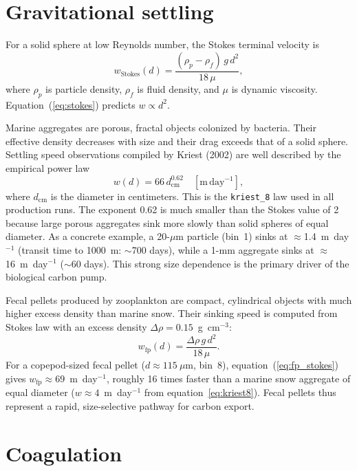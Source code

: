 \documentclass[12pt,a4paper]{report}
\numberwithin{equation}{chapter}
\begin{document}
\section{Gravitational settling}

For a solid sphere at low Reynolds number, the Stokes terminal velocity is
\begin{equation}
    w_\mathrm{Stokes}(d)
    = \frac{(\rho_p - \rho_f)\,g\,d^2}{18\,\mu},
    \label{eq:stokes}
\end{equation}
where $\rho_p$ is particle density, $\rho_f$ is fluid density, and $\mu$ is
dynamic viscosity. Equation~(\ref{eq:stokes}) predicts $w \propto d^2$.

Marine aggregates are porous, fractal objects colonized by bacteria. Their
effective density decreases with size and their drag exceeds that of a solid
sphere. Settling speed observations compiled by Kriest (2002) are well
described by the empirical power law
\begin{equation}
    w(d) = 66\,d_\mathrm{cm}^{0.62} \quad [\mathrm{m\,day^{-1}}],
    \label{eq:kriest8}
\end{equation}
where $d_\mathrm{cm}$ is the diameter in centimeters.
This is the \texttt{kriest\_8} law used in all production runs.
The exponent 0.62 is much smaller than the Stokes value of 2 because large
porous aggregates sink more slowly than solid spheres of equal diameter.
As a concrete example, a 20-$\mu$m particle (bin~1) sinks at
$\approx$1.4~m~day$^{-1}$ (transit time to 1000~m: $\sim$700 days), while
a 1-mm aggregate sinks at $\approx$16~m~day$^{-1}$ ($\sim$60 days).
This strong size dependence is the primary driver of the biological carbon pump.

Fecal pellets produced by zooplankton are compact, cylindrical objects
with much higher excess density than marine snow. Their sinking speed is
computed from Stokes law with an excess density
$\Delta\rho = 0.15$~g~cm$^{-3}$:
\begin{equation}
    w_\mathrm{fp}(d)
    = \frac{\Delta\rho\,g\,d^2}{18\,\mu}.
    \label{eq:fp_stokes}
\end{equation}
For a copepod-sized fecal pellet ($d \approx 115~\mu$m, bin~8),
equation~(\ref{eq:fp_stokes}) gives $w_\mathrm{fp} \approx 69$~m~day$^{-1}$,
roughly 16 times faster than a marine snow aggregate of equal diameter
($w \approx 4$~m~day$^{-1}$ from equation~\ref{eq:kriest8}).
Fecal pellets thus represent a rapid, size-selective pathway for carbon export.

\section{Coagulation}
\end{document}
